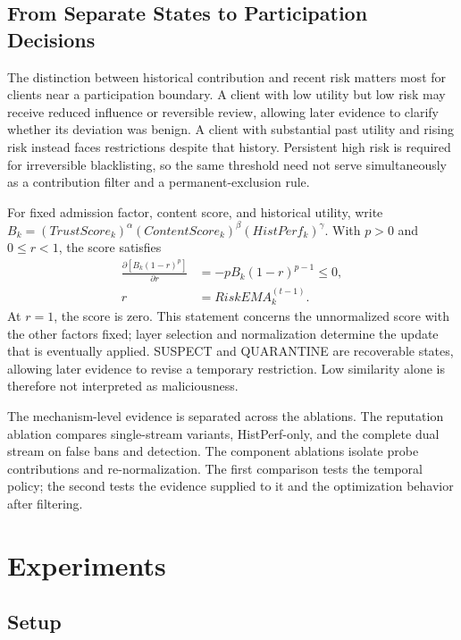 \documentclass[conference,compsoc]{IEEEtran}
\begin{document}
\subsection{From Separate States to Participation Decisions}

The distinction between historical contribution and recent risk matters most for clients near a participation boundary. A client with low utility but low risk may receive reduced influence or reversible review, allowing later evidence to clarify whether its deviation was benign. A client with substantial past utility and rising risk instead faces restrictions despite that history. Persistent high risk is required for irreversible blacklisting, so the same threshold need not serve simultaneously as a contribution filter and a permanent-exclusion rule.

For fixed admission factor, content score, and historical utility, write $B_k=(TrustScore_k)^\alpha(ContentScore_k)^\beta(HistPerf_k)^\gamma$. With $p>0$ and $0\leq r<1$, the score satisfies
\begin{equation}
    \begin{aligned}
        \frac{\partial [B_k(1-r)^p]}{\partial r} & =-pB_k(1-r)^{p-1}\leq0, \\
        r                                        & =RiskEMA_k^{(t-1)}.
    \end{aligned}
\end{equation}
At $r=1$, the score is zero. This statement concerns the unnormalized score with the other factors fixed; layer selection and normalization determine the update that is eventually applied. SUSPECT and QUARANTINE are recoverable states, allowing later evidence to revise a temporary restriction. Low similarity alone is therefore not interpreted as maliciousness.

The mechanism-level evidence is separated across the ablations. The reputation ablation compares single-stream variants, HistPerf-only, and the complete dual stream on false bans and detection. The component ablations isolate probe contributions and re-normalization. The first comparison tests the temporal policy; the second tests the evidence supplied to it and the optimization behavior after filtering.

\section{Experiments}

\subsection{Setup}
\end{document}
